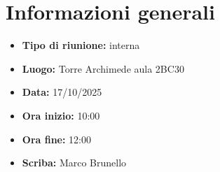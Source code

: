 \section{Informazioni generali}

\begin{itemize}
    \item \textbf{Tipo di riunione:} interna
    \item \textbf{Luogo:} Torre Archimede aula 2BC30
    \item \textbf{Data:} 17/10/2025
    \item \textbf{Ora inizio:} 10:00
    \item \textbf{Ora fine:} 12:00
    \item \textbf{Scriba:} Marco Brunello
\end{itemize}